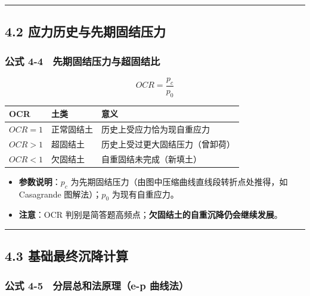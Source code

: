 \documentclass[
]{article}
\newcounter{none} %
\providecommand{\tightlist}{%
  \setlength{\itemsep}{0pt}\setlength{\parskip}{0pt}}
\begin{document}
\begin{center}\rule{0.5\linewidth}{0.5pt}\end{center}

\subsection{4.2
应力历史与先期固结压力}\label{ux5e94ux529bux5386ux53f2ux4e0eux5148ux671fux56faux7ed3ux538bux529b}

\subsubsection{公式
4-4　先期固结压力与超固结比}\label{ux516cux5f0f-4-4-ux5148ux671fux56faux7ed3ux538bux529bux4e0eux8d85ux56faux7ed3ux6bd4}

\[OCR=\frac{p_c}{p_0}\]

{\def\LTcaptype{none} %
\begin{longtable}[]{@{}lll@{}}
\toprule\noalign{}
OCR & 土类 & 意义 \\
\midrule\noalign{}
\endhead
\bottomrule\noalign{}
\endlastfoot
\(OCR=1\) & 正常固结土 & 历史上受应力恰为现自重应力 \\
\(OCR>1\) & 超固结土 & 历史上受过更大固结压力（曾卸荷） \\
\(OCR<1\) & 欠固结土 & 自重固结未完成（新填土） \\
\end{longtable}
}

\begin{itemize}
\tightlist
\item
  \textbf{参数说明}：\(p_c\)
  为先期固结压力（由图中压缩曲线直线段转折点处推得，如 Casagrande
  图解法）；\(p_0\) 为现有自重应力。
\item
  \textbf{注意}：OCR
  判别是简答题高频点；\textbf{欠固结土的自重沉降仍会继续发展}。
\end{itemize}

\begin{center}\rule{0.5\linewidth}{0.5pt}\end{center}

\subsection{4.3
基础最终沉降计算}\label{ux57faux7840ux6700ux7ec8ux6c89ux964dux8ba1ux7b97}

\subsubsection{公式 4-5　分层总和法原理（e-p
曲线法）}\label{ux516cux5f0f-4-5-ux5206ux5c42ux603bux548cux6cd5ux539fux7406e-p-ux66f2ux7ebfux6cd5}
\end{document}
